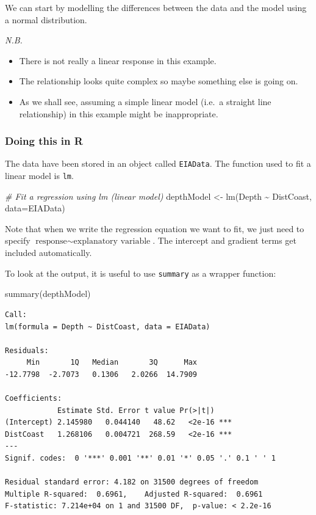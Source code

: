 \documentclass[
  oneside]{krantz}
\newenvironment{Shaded}{\begin{snugshade}}{\end{snugshade}}
\newcommand{\AttributeTok}[1]{\textcolor[rgb]{0.77,0.63,0.00}{#1}}
\newcommand{\CommentTok}[1]{\textcolor[rgb]{0.56,0.35,0.01}{\textit{#1}}}
\newcommand{\FunctionTok}[1]{\textcolor[rgb]{0.00,0.00,0.00}{#1}}
\newcommand{\NormalTok}[1]{#1}
\newcommand{\OtherTok}[1]{\textcolor[rgb]{0.56,0.35,0.01}{#1}}
\newcommand{\SpecialCharTok}[1]{\textcolor[rgb]{0.00,0.00,0.00}{#1}}
\providecommand{\tightlist}{%
  \setlength{\itemsep}{0pt}\setlength{\parskip}{0pt}}
\begin{document}
We can start by modelling the differences between the data and the model using a normal distribution.

\emph{N.B.}

\begin{itemize}
\tightlist
\item
  There is not really a linear response in this example.
\item
  The relationship looks quite complex so maybe something else is going on.
\item
  As we shall see, assuming a simple linear model (i.e.~a straight line relationship) in this example might be inappropriate.
\end{itemize}

\hypertarget{doing-this-in-r-24}{%
\subsubsection{Doing this in R}\label{doing-this-in-r-24}}

The data have been stored in an object called \texttt{EIAData}. The function used to fit a linear model is \texttt{lm}.

\begin{Shaded}
\begin{Highlighting}[]
\CommentTok{\# Fit a regression using lm (linear model)}
\NormalTok{depthModel }\OtherTok{\textless{}{-}} \FunctionTok{lm}\NormalTok{(Depth }\SpecialCharTok{\textasciitilde{}}\NormalTok{ DistCoast,  }\AttributeTok{data=}\NormalTok{EIAData)}
\end{Highlighting}
\end{Shaded}

Note that when we write the regression equation we want to fit, we just need to specify \(\textrm{response} \sim \textrm{explanatory variable}\). The intercept and gradient terms get included automatically.

To look at the output, it is useful to use \texttt{summary} as a wrapper function:

\begin{Shaded}
\begin{Highlighting}[]
\FunctionTok{summary}\NormalTok{(depthModel)}
\end{Highlighting}
\end{Shaded}

\begin{verbatim}
Call:
lm(formula = Depth ~ DistCoast, data = EIAData)

Residuals:
     Min       1Q   Median       3Q      Max 
-12.7798  -2.7073   0.1306   2.0266  14.7909 

Coefficients:
            Estimate Std. Error t value Pr(>|t|)    
(Intercept) 2.145980   0.044140   48.62   <2e-16 ***
DistCoast   1.268106   0.004721  268.59   <2e-16 ***
---
Signif. codes:  0 '***' 0.001 '**' 0.01 '*' 0.05 '.' 0.1 ' ' 1

Residual standard error: 4.182 on 31500 degrees of freedom
Multiple R-squared:  0.6961,    Adjusted R-squared:  0.6961 
F-statistic: 7.214e+04 on 1 and 31500 DF,  p-value: < 2.2e-16
\end{verbatim}
\end{document}
